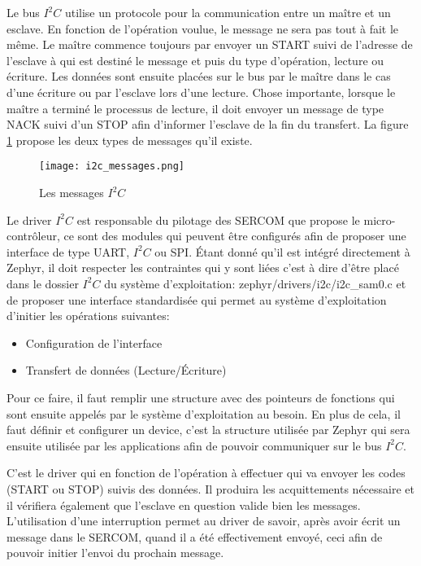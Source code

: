 Le bus $I^{2}C$ utilise un protocole pour la communication entre un maître et un esclave. En fonction de l'opération voulue, le message ne sera pas tout à fait le même. Le maître commence toujours par envoyer un START suivi de l'adresse de l'esclave à qui est destiné le message et puis du type d'opération, lecture ou écriture. Les données sont ensuite placées sur le bus par le maître dans le cas d'une écriture ou par l'esclave lors d'une lecture. Chose importante, lorsque le maître a terminé le processus de lecture, il doit envoyer un message de type NACK suivi d'un STOP afin d'informer l'esclave de la fin du transfert.
La figure \ref{fig:i2c_messages} propose les deux types de messages qu'il existe.

\begin{figure}[htb]
\centering 
\texttt{[image: i2c\_messages.png]} 
\caption{Les messages $I^{2}C$}
\label{fig:i2c_messages}
\end{figure}

Le driver $I^{2}C$ est responsable du pilotage des SERCOM que propose le micro-contrôleur, ce sont des modules qui peuvent être configurés afin de proposer une interface de type UART, $I^{2}C$ ou SPI. Étant donné qu'il est intégré directement à Zephyr, il doit respecter les contraintes qui y sont liées c'est à dire d'être placé dans le dossier $I^{2}C$ du système d'exploitation: zephyr/drivers/i2c/i2c\_sam0.c et de proposer une interface standardisée qui permet au système d'exploitation d'initier les opérations suivantes:

\begin{itemize}
\item Configuration de l'interface
\item Transfert de données (Lecture/Écriture)
\end{itemize}

Pour ce faire, il faut remplir une structure avec des pointeurs de fonctions qui sont ensuite appelés par le système d'exploitation au besoin. En plus de cela, il faut définir et configurer un device, c'est la structure utilisée par Zephyr qui sera ensuite utilisée par les applications afin de pouvoir communiquer sur le bus $I^{2}C$.

C'est le driver qui en fonction de l'opération à effectuer qui va envoyer les codes (START ou STOP) suivis des données. Il produira les acquittements nécessaire et il vérifiera également que l'esclave en question valide bien les messages. L'utilisation d'une interruption permet au driver de savoir, après avoir écrit un message dans le SERCOM, quand il a été effectivement envoyé, ceci afin de pouvoir initier l'envoi du prochain message.

